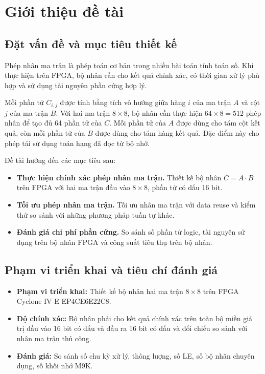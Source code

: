 \section{Giới thiệu đề tài}

\subsection{Đặt vấn đề và mục tiêu thiết kế}

Phép nhân ma trận là phép toán cơ bản trong nhiều bài toán tính toán số.
Khi thực hiện trên FPGA, bộ nhân cần cho kết quả chính xác, có thời gian
xử lý phù hợp và sử dụng tài nguyên phần cứng hợp lý.

Mỗi phần tử $C_{i,j}$ được tính bằng tích vô hướng giữa hàng $i$ của
ma trận $A$ và cột $j$ của ma trận $B$. Với hai ma trận $8\times8$,
bộ nhân cần thực hiện $64\times8=512$ phép nhân để tạo đủ 64 phần tử
của $C$. Mỗi phần tử của $A$ được dùng cho tám cột kết quả, còn mỗi
phần tử của $B$ được dùng cho tám hàng kết quả. Đặc điểm này cho phép
tái sử dụng toán hạng đã đọc từ bộ nhớ.

Đề tài hướng đến các mục tiêu sau:

\begin{itemize}
    \item \textbf{Thực hiện chính xác phép nhân ma trận.}
    Thiết kế bộ nhân $C=A\cdot B$ trên FPGA với hai ma trận đầu vào
    $8\times8$, phần tử có dấu 16 bit.

    \item \textbf{Tối ưu phép nhân ma trận.}
    Tối ưu nhân ma trận với data reuse và kiểm thử so sánh với những
    phương pháp tuần tự khác.

    \item \textbf{Đánh giá chi phí phần cứng.}
    So sánh số phần tử logic, tài nguyên sử dụng trên bộ nhân FPGA 
    và công suất tiêu thụ trên bộ nhân.
\end{itemize}

\subsection{Phạm vi triển khai và tiêu chí đánh giá}

\begin{itemize}
    \item \textbf{Phạm vi triển khai:} Thiết kế bộ nhân hai ma trận
    $8\times8$ trên FPGA Cyclone IV E EP4CE6E22C8.

    \item \textbf{Độ chính xác:} Bộ nhân phải cho kết quả chính xác
    trên toàn bộ miền giá trị đầu vào 16 bit có dấu và đầu ra 16 bit
    có dấu và đối chiếu so sánh với nhân ma trận thủ công.

    \item \textbf{Đánh giá:} So sánh số chu kỳ xử lý, thông lượng,
    số LE, số bộ nhân chuyên dụng, số khối nhớ M9K.
\end{itemize}
